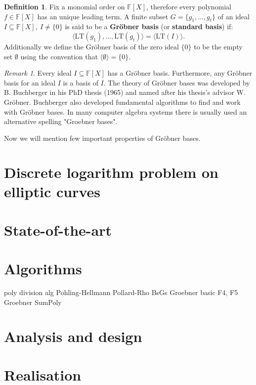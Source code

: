 \documentclass[thesis=M,english]{FITthesis}[2012/10/20]
\theoremstyle{remark}
\newtheorem*{RM}{Remark}
\theoremstyle{definition}
\newtheorem{DF}{Definition}[section]
\begin{document}
\begin{DF}
Fix a monomial order on $\mathbb{F}[X]$, therefore every polynomial $f \in \mathbb{F}[X]$ has an unique leading term. A finite subset $G = \{g_1, \ldots, g_t \}$ of an ideal $I \subseteq \mathbb{F}[X],\ I \neq \{ 0 \}$ is said to be a \textbf{Gröbner basis} (or \textbf{standard basis}) if:
$$
\langle \text{LT}(g_1), \ldots, \text{LT}(g_t) \rangle = \langle \text{LT}(I) \rangle.
$$
Additionally we define the Gröbner basis of the zero ideal $\{0\}$ to be the empty set $\emptyset$ using the convention that $\langle \emptyset \rangle = \{0\}.$
\end{DF}
\begin{RM}
Every ideal $I \subseteq \mathbb{F}[X]$ has a Gröbner basis. Furthermore, any Gröbner basis for an ideal $I$ is a basis of $I$. The theory of Gröbner bases was developed by B. Buchberger in his PhD thesis (1965) and named after his thesis's advisor W. Gröbner. Buchberger also developed fundamental algorithms to find and work with Gröbner bases. In many computer algebra systems there is usually used an alternative spelling "Groebner bases".
\end{RM}
\phantom{.}
\phantom{.}
\noindent Now we will mention few important properties of Gröbner bases.


%
%
\chapter{Discrete logarithm problem on elliptic curves}
\chapter{State-of-the-art}

\chapter{Algorithms}
poly division alg
Pohling-Hellmann
Pollard-Rho
BsGs
Groebner basic
F4, F5 Groebner
SumPoly 
\chapter{Analysis and design}

\chapter{Realisation}
\end{document}
